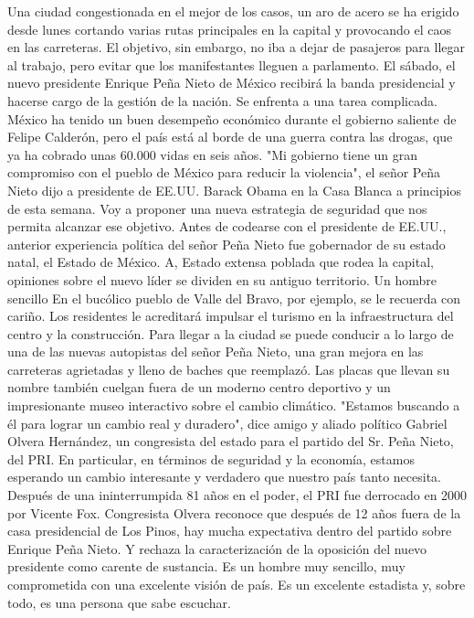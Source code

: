 Una ciudad congestionada en el mejor de los casos, un aro de acero se ha erigido desde lunes cortando varias rutas principales en la capital y provocando el caos en las carreteras.
El objetivo, sin embargo, no iba a dejar de pasajeros para llegar al trabajo, pero evitar que los manifestantes lleguen a parlamento.
El sábado, el nuevo presidente Enrique Peña Nieto de México recibirá la banda presidencial y hacerse cargo de la gestión de la nación.
Se enfrenta a una tarea complicada.
México ha tenido un buen desempeño económico durante el gobierno saliente de Felipe Calderón, pero el país está al borde de una guerra contra las drogas, que ya ha cobrado unas 60.000 vidas en seis años.
"Mi gobierno tiene un gran compromiso con el pueblo de México para reducir la violencia", el señor Peña Nieto dijo a presidente de EE.UU. Barack Obama en la Casa Blanca a principios de esta semana.
Voy a proponer una nueva estrategia de seguridad que nos permita alcanzar ese objetivo.
Antes de codearse con el presidente de EE.UU., anterior experiencia política del señor Peña Nieto fue gobernador de su estado natal, el Estado de México.
A, Estado extensa poblada que rodea la capital, opiniones sobre el nuevo líder se dividen en su antiguo territorio.
Un hombre sencillo
En el bucólico pueblo de Valle del Bravo, por ejemplo, se le recuerda con cariño.
Los residentes le acreditará impulsar el turismo en la infraestructura del centro y la construcción.
Para llegar a la ciudad se puede conducir a lo largo de una de las nuevas autopistas del señor Peña Nieto, una gran mejora en las carreteras agrietadas y lleno de baches que reemplazó.
Las placas que llevan su nombre también cuelgan fuera de un moderno centro deportivo y un impresionante museo interactivo sobre el cambio climático.
"Estamos buscando a él para lograr un cambio real y duradero", dice amigo y aliado político Gabriel Olvera Hernández, un congresista del estado para el partido del Sr. Peña Nieto, del PRI.
En particular, en términos de seguridad y la economía, estamos esperando un cambio interesante y verdadero que nuestro país tanto necesita.
Después de una ininterrumpida 81 años en el poder, el PRI fue derrocado en 2000 por Vicente Fox.
Congresista Olvera reconoce que después de 12 años fuera de la casa presidencial de Los Pinos, hay mucha expectativa dentro del partido sobre Enrique Peña Nieto.
Y rechaza la caracterización de la oposición del nuevo presidente como carente de sustancia.
Es un hombre muy sencillo, muy comprometida con una excelente visión de país.
Es un excelente estadista y, sobre todo, es una persona que sabe escuchar.
